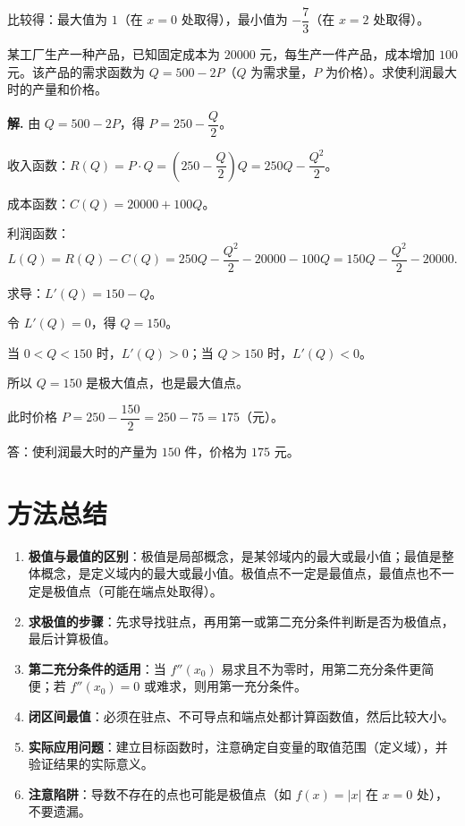 \documentclass[11pt]{ctexrep}
\begin{document}
比较得：最大值为 $1$（在 $x = 0$ 处取得），最小值为 $-\dfrac{7}{3}$（在 $x = 2$ 处取得）。

\begin{realexam}[2023 上海秋考]
    某工厂生产一种产品，已知固定成本为 $20000$ 元，每生产一件产品，成本增加 $100$ 元。该产品的需求函数为 $Q = 500 - 2P$（$Q$ 为需求量，$P$ 为价格）。求使利润最大时的产量和价格。
\end{realexam}

\textbf{解.} 由 $Q = 500 - 2P$，得 $P = 250 - \dfrac{Q}{2}$。

收入函数：$R(Q) = P \cdot Q = \left(250 - \dfrac{Q}{2}\right)Q = 250Q - \dfrac{Q^2}{2}$。

成本函数：$C(Q) = 20000 + 100Q$。

利润函数：
\[
    L(Q) = R(Q) - C(Q) = 250Q - \frac{Q^2}{2} - 20000 - 100Q = 150Q - \frac{Q^2}{2} - 20000.
\]

求导：$L'(Q) = 150 - Q$。

令 $L'(Q) = 0$，得 $Q = 150$。

当 $0 < Q < 150$ 时，$L'(Q) > 0$；当 $Q > 150$ 时，$L'(Q) < 0$。

所以 $Q = 150$ 是极大值点，也是最大值点。

此时价格 $P = 250 - \dfrac{150}{2} = 250 - 75 = 175$（元）。

答：使利润最大时的产量为 $150$ 件，价格为 $175$ 元。

\section*{方法总结}

\begin{enumerate}
    \item \textbf{极值与最值的区别}：极值是局部概念，是某邻域内的最大或最小值；最值是整体概念，是定义域内的最大或最小值。极值点不一定是最值点，最值点也不一定是极值点（可能在端点处取得）。
    \item \textbf{求极值的步骤}：先求导找驻点，再用第一或第二充分条件判断是否为极值点，最后计算极值。
    \item \textbf{第二充分条件的适用}：当 $f''(x_0)$ 易求且不为零时，用第二充分条件更简便；若 $f''(x_0) = 0$ 或难求，则用第一充分条件。
    \item \textbf{闭区间最值}：必须在驻点、不可导点和端点处都计算函数值，然后比较大小。
    \item \textbf{实际应用问题}：建立目标函数时，注意确定自变量的取值范围（定义域），并验证结果的实际意义。
    \item \textbf{注意陷阱}：导数不存在的点也可能是极值点（如 $f(x) = |x|$ 在 $x = 0$ 处），不要遗漏。
\end{enumerate}
\end{document}
